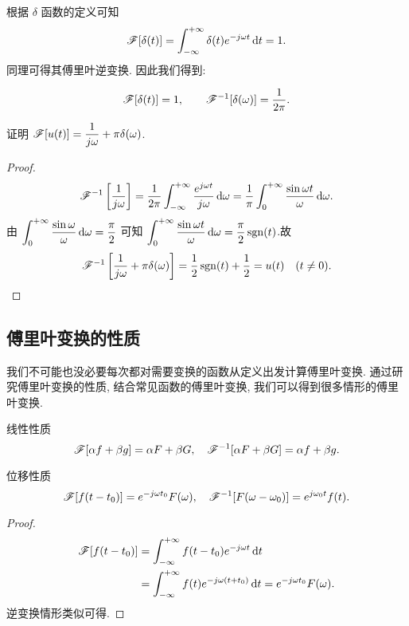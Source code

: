 根据 $\delta$ 函数的定义可知
\[\mathscr{F}[\delta(t)]=\int_{-\infty}^{+\infty}\delta(t)e^{-j\omega t}\,\mathrm{d} t=1.\]
同理可得其傅里叶逆变换.
因此我们得到:
\begin{second@}
	\[\mathscr{F}[\delta(t)]=1,\qquad
	\mathscr{F}^{-1}[\delta(\omega)]=\dfrac1{2\pi}.\]
\end{second@}

\begin{example}
	证明 \emph{$\mathscr{F}[u(t)]=\dfrac1{j\omega}+\pi\delta(\omega)$}.
\end{example}

\begin{proof}
		\[\mathscr{F}^{-1}\left[\frac1{j\omega}\right]
		=\frac1{2\pi}\int_{-\infty}^{+\infty}\frac{e^{j\omega t}}{j\omega} \,\mathrm{d}\omega
		=\frac1\pi\int_0^{+\infty}\frac{\sin\omega t}{\omega} \,\mathrm{d}\omega.\]
	{由
		$\displaystyle\int_0^{+\infty}\frac{\sin\omega}\omega \,\mathrm{d}\omega=\dfrac\pi2$
		可知
		$\displaystyle\int_0^{+\infty}\frac{\sin\omega t}\omega \,\mathrm{d}\omega=\frac\pi2\operatorname{sgn}(t)$.故
		\[\mathscr{F}^{-1} \left[\frac1{j\omega}+\pi\delta(\omega)\right]
		=\frac{1}{2}\operatorname{sgn}(t)+\frac{1}{2} =u(t)\quad (t\neq 0).\qedhere\]
	}
\end{proof}

\subsection{傅里叶变换的性质}

我们不可能也没必要每次都对需要变换的函数从定义出发计算傅里叶变换.
通过研究傅里叶变换的性质, 结合常见函数的傅里叶变换, 我们可以得到很多情形的傅里叶变换.

\begin{main}{线性性质}
	\[\mathscr{F}[\alpha f+\beta g]=\alpha F+\beta G,\quad
	\mathscr{F}^{-1}[\alpha F+\beta G]=\alpha f+\beta g.\]
\end{main}

\begin{main}{位移性质}
	\[\mathscr{F}[f(t-t_0)]=e^{-j\omega t_0}F(\omega),\quad
	\mathscr{F}^{-1}[F(\omega-\omega_0)]=e^{j\omega_0 t}f(t).\]
\end{main}

\begin{proof}
	\begin{align*}
		\mathscr{F}[f(t-t_0)]&=\int_{-\infty}^{+\infty}f(t-t_0)e^{-j\omega t}\,\mathrm{d} t\\
		&=\int_{-\infty}^{+\infty}f(t)e^{-j\omega (t+t_0)}\,\mathrm{d} t=e^{-j\omega t_0}F(\omega).
	\end{align*}
	{逆变换情形类似可得.\qedhere}
\end{proof}

